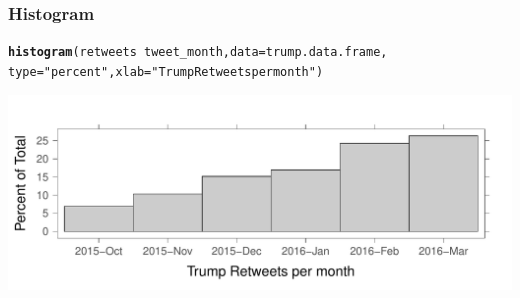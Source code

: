 \documentclass{beamer}\usepackage[]{graphicx}\usepackage[]{color}
\makeatletter
\newcommand{\hlstr}[1]{\textcolor[rgb]{0.2,0.2,0.2}{#1}}%
\newcommand{\hlopt}[1]{\textcolor[rgb]{0.102,0.102,0.102}{#1}}%
\newcommand{\hlstd}[1]{\textcolor[rgb]{0.102,0.102,0.102}{#1}}%
\newcommand{\hlkwc}[1]{\textcolor[rgb]{0.2,0.2,0.2}{#1}}%
\newcommand{\hlkwd}[1]{\textcolor[rgb]{0.102,0.102,0.102}{\textbf{#1}}}%
\newenvironment{kframe}{%
 \def\at@end@of@kframe{}%
 \ifinner\ifhmode%
  \def\at@end@of@kframe{\end{minipage}}%
  \begin{minipage}{\columnwidth}%
 \fi\fi%
 \def\FrameCommand##1{\hskip\@totalleftmargin \hskip-\fboxsep
 \colorbox{shadecolor}{##1}\hskip-\fboxsep
     \hskip-\linewidth \hskip-\@totalleftmargin \hskip\columnwidth}%
 \MakeFramed {\advance\hsize-\width
   \@totalleftmargin\z@ \linewidth\hsize
   \@setminipage}}%
 {\par\unskip\endMakeFramed%
 \at@end@of@kframe}
\newenvironment{knitrout}{}{} %
\renewenvironment{knitrout}{\begin{spacing}{0.75}\begin{tiny}}{\end{tiny}\end{spacing}}
\makeatother
\begin{document}
\begin{frame}[fragile]
\frametitle{Histogram}

\begin{knitrout}\small
{}\color{fgcolor}\begin{kframe}
\begin{alltt}
\hlkwd{histogram}\hlstd{(retweets} \hlopt{~} \hlstd{tweet_month,} \hlkwc{data}\hlstd{=trump.data.frame,}
          \hlkwc{type}\hlstd{=}\hlstr{"percent"}\hlstd{,} \hlkwc{xlab}\hlstd{=}\hlstr{"Trump Retweets per month"}\hlstd{)}
\end{alltt}
\end{kframe}

{\centering \includegraphics[width=0.99\linewidth]{figure/graphics-histogram-1} 

}



\end{knitrout}

\end{frame}
\end{document}
